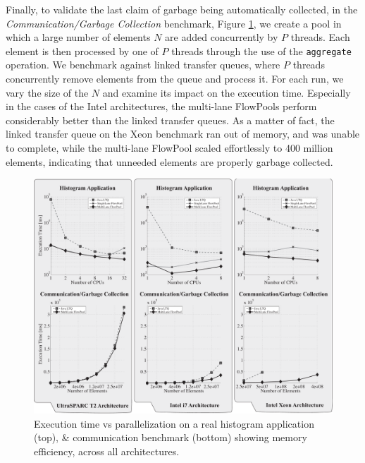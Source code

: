 Finally, to validate the last claim of garbage being automatically
collected, in the \textit{Communication/Garbage Collection} benchmark,
Figure \ref{fig:eval-hist-comm}, we create a pool in which a
large number of elements $N$ are added concurrently by $P$
threads. Each element is then processed by one of $P$ threads through
the use of the \verb=aggregate= operation.
We benchmark against linked transfer queues, where $P$ threads concurrently remove
elements from the queue and process it.
For each run, we vary the size of the $N$ and examine its impact on the execution time.
Especially in the cases of the Intel architectures, the multi-lane
FlowPools perform considerably better than the linked transfer queues.
As a matter of fact, the linked transfer queue on the Xeon benchmark ran out of
memory, and was unable to complete, while the multi-lane FlowPool scaled effortlessly
to 400 million elements, indicating that unneeded elements are properly garbage collected.

\begin{figure}[t!]
\centering
\includegraphics[width=\textwidth]{images/hist-comm}
\setlength{\abovecaptionskip}{-10pt}
\setlength{\belowcaptionskip}{-15pt}
\caption{Execution time vs parallelization on a real histogram application
(top), \& communication benchmark (bottom) showing memory efficiency,
across all architectures.}
\label{fig:eval-hist-comm}
\end{figure}


